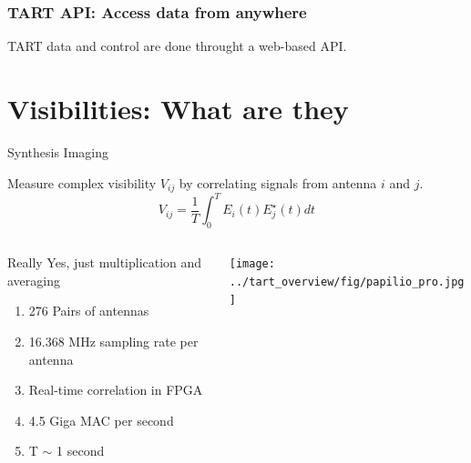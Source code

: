 \documentclass[ignorenonframetext]{beamer}
\begin{document}
\begin{frame}[containsverbatim]
\frametitle{TART API: Access data from anywhere}
TART data and control are done throught a web-based API. 

%
%

\end{frame}

\section{Visibilities: What are they}

\frame{\tableofcontents[currentsection]}

\begin{frame}{Synthesis Imaging}

Measure complex visibility $V_{ij}$ by correlating signals from antenna $i$ and $j$.
\[ V_{ij} = \frac{1}{T} \int_0^T E_i(t) E_j^{\star}(t) dt \]
\begin{columns}
 \begin{column}{0.55\linewidth}
\begin{block}{Really}
  Yes, just multiplication and averaging
\end{block}
\begin{enumerate}
 \item 276 Pairs of antennas
 \item 16.368 MHz sampling rate per antenna
 \item Real-time correlation in FPGA
  \item 4.5 Giga MAC per second
 \item T $\sim$ 1 second
\end{enumerate}
 \end{column}
 \begin{column}{0.45\linewidth}
   \texttt{[image: ../tart\_overview/fig/papilio\_pro.jpg]}
 \end{column}
\end{columns}
\end{frame}
\end{document}
